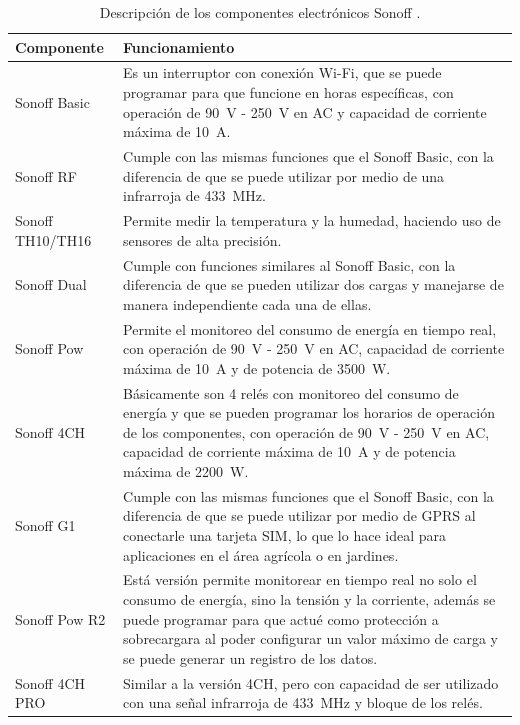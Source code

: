 \begin{table}[H]
\centering
\caption{Descripción de los componentes electrónicos Sonoff \cite{Sonoff2018}.} \label{T:Sonoff}
\begin{tabular}{ | >{\centering\arraybackslash}m{2.5cm} | >{\centering\arraybackslash}m{12cm}  | }
    \hline
    \cellcolor{cl} \textbf{Componente} & \cellcolor{cl} \textbf{Funcionamiento}  \\
    \hline
    \hline
    Sonoff Basic & Es un interruptor con conexión Wi-Fi, que se puede programar para que funcione en horas específicas, con operación de \SI{90}{\volt} - \SI{250}{\volt} en AC y capacidad de corriente máxima de \SI{10}{A}.\\ \hline
    Sonoff RF & Cumple con las mismas funciones que el Sonoff Basic, con la diferencia de que se puede utilizar por medio de una infrarroja de \SI{433}{MHz}. \\ \hline
    Sonoff TH10/TH16 & Permite medir la temperatura y la humedad, haciendo uso de sensores de alta precisión.  \\ \hline
    Sonoff Dual & Cumple con funciones similares al Sonoff Basic, con la diferencia de que se pueden utilizar dos cargas y manejarse de manera independiente cada una de ellas. \\ \hline
    Sonoff Pow & Permite el monitoreo del consumo de energía en tiempo real, con operación de \SI{90}{\volt} - \SI{250}{\volt} en AC, capacidad de corriente máxima de \SI{10}{A} y de potencia de \SI{3500}{W}.\\ \hline
    Sonoff 4CH & Básicamente son 4 relés con monitoreo del consumo de energía y que se pueden programar los horarios de operación de los componentes, con operación de \SI{90}{\volt} - \SI{250}{\volt} en AC, capacidad de corriente máxima de \SI{10}{A} y de potencia máxima de \SI{2200}{W}. \\ \hline
    Sonoff G1 & Cumple con las mismas funciones que el Sonoff Basic, con la diferencia de que se puede utilizar por medio de GPRS al conectarle una tarjeta SIM, lo que lo hace ideal para aplicaciones en el área agrícola o en jardines.  \\ \hline 
    Sonoff Pow R2 & Está versión permite monitorear en tiempo real no solo el consumo de energía, sino la tensión y la corriente, además se puede programar para que actué como protección a sobrecargara al poder configurar un valor máximo de carga y se puede generar un registro de los datos.  \\ \hline
    Sonoff 4CH PRO & Similar a la versión 4CH, pero con capacidad de ser utilizado con una señal infrarroja de \SI{433}{MHz} y bloque de los relés.   \\ 
    \hline
\end{tabular}
\end{table}

